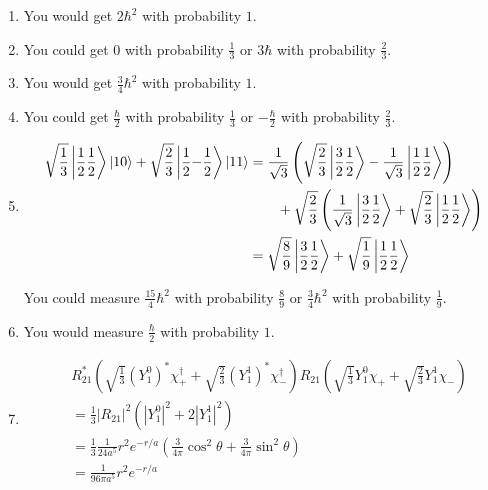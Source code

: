 \documentclass{article}
\begin{document}
\begin{enumerate}
  \item You would get $2 \hbar^2$ with probability $1$.

  \item You could get $0$ with probability $\frac{1}{3}$ or $3 \hbar$ with probability $\frac{2}{3}$.

  \item You would get $\frac{3}{4} \hbar^2$ with probability $1$.

  \item You could get $\frac{\hbar}{2}$ with probability $\frac{1}{3}$ or $-\frac{\hbar}{2}$ with probability $\frac{2}{3}$.

  \item

        \begin{align*}
          \sqrt{\frac{1}{3}} \Ket{\frac{1}{2} \frac{1}{2}} \ket{1 0} + \sqrt{\frac{2}{3}} \Ket{\frac{1}{2} {-\frac{1}{2}}} \ket{1 1} & = \frac{1}{\sqrt{3}} \left( \sqrt{\frac{2}{3}} \Ket{\frac{3}{2} \frac{1}{2}} - \frac{1}{\sqrt{3}} \Ket{\frac{1}{2} \frac{1}{2}} \right)        \\
                                                                                                                                     & \qquad + \sqrt{\frac{2}{3}} \left( \frac{1}{\sqrt{3}} \Ket{\frac{3}{2} \frac{1}{2}} + \sqrt{\frac{2}{3}} \Ket{\frac{1}{2} \frac{1}{2}} \right) \\
                                                                                                                                     & = \sqrt{\frac{8}{9}} \Ket{\frac{3}{2} \frac{1}{2}} + \sqrt{\frac{1}{9}} \Ket{\frac{1}{2} \frac{1}{2}}
        \end{align*}

        You could measure $\frac{15}{4} \hbar^2$ with probability $\frac{8}{9}$ or $\frac{3}{4} \hbar^2$ with probability $\frac{1}{9}$.

  \item You would measure $\frac{\hbar}{2}$ with probability $1$.

  \item

        \begin{align*}
           & R_{2 1}^* \left( \sqrt{\frac{1}{3}} (Y_1^0)^* \chi_+^\dagger + \sqrt{\frac{2}{3}} (Y_1^1)^* \chi_-^\dagger \right) R_{2 1} \left( \sqrt{\frac{1}{3}} Y_1^0 \chi_+ + \sqrt{\frac{2}{3}} Y_1^1 \chi_- \right) \\
           & = \frac{1}{3} |R_{2 1}|^2 (|Y_1^0|^2 + 2 |Y_1^1|^2)                                                                                                                                                         \\
           & = \frac{1}{3} \frac{1}{24 a^5} r^2 e^{-r / a} \left( \frac{3}{4 \pi} \cos^2 \theta + \frac{3}{4 \pi} \sin^2 \theta \right)                                                                                  \\
           & = \frac{1}{96 \pi a^5} r^2 e^{-r / a}
        \end{align*}


\end{enumerate}
\end{document}
